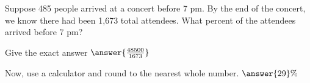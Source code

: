 \documentclass{ximera}
\author{David Kish}
\begin{document}
   \begin{exercise}
Suppose 485 people arrived at a concert before 7 pm.  By the end of the concert, we know there had been 1,673 total attendees.  What percent of the attendees arrived before 7 pm? 
 
Give the exact answer $\answer{\frac{48500}{1673}}$

Now, use a calculator and round to the nearest whole number. $\answer{29}\%$ \calcHW
 \end{exercise}
\end{document}
